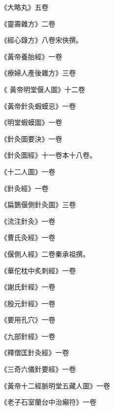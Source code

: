 \begin{pinyinscope}
 《大略丸》五卷



 《靈壽雜方》二卷



 《經心錄方》八卷宋俠撰。



 《黃帝養胎經》一卷



 《療婦人產後雜方》三卷



 《
 黃帝明堂偃人圖》十二卷



 《黃帝針灸蝦蟆忌》一卷



 《明堂蝦蟆圖》一卷



 《針灸圖要決》一卷



 《針灸圖經》十一卷本十八卷。



 《十二人圖》一卷



 《針灸經》一卷



 《扁鵲偃側針灸圖》三卷



 《流注針灸》一卷



 《曹氏灸經》一卷



 《偃側人經》二卷秦承祖撰。



 《華佗枕中炙刺經》一卷



 《謝氏針經》一卷



 《殷元針經》一卷



 《要用孔穴》一卷



 《九部針經》一卷



 《釋僧匡針灸經》一卷



 《三奇六儀針要經》一卷



 《黃帝十二經脈明堂五藏人圖》一卷



 《老子石室蘭台中治癩符》一卷




\end{pinyinscope}
